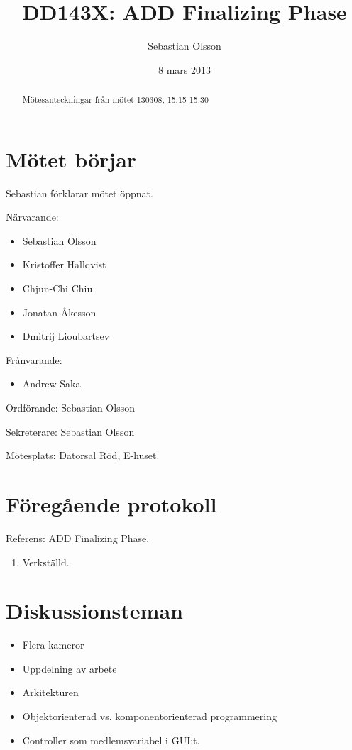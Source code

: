 \documentclass[a4paper,12pt]{article}
\author{Sebastian Olsson}
\title{DD143X: ADD Finalizing Phase}
\date{8 mars 2013}
\begin{document}
\maketitle
\begin{abstract}
    Mötesanteckningar från mötet 130308, 15:15-15:30
\end{abstract}

\section{Mötet börjar}
Sebastian förklarar mötet öppnat.

Närvarande:
\begin{itemize}
\item Sebastian Olsson
\item Kristoffer Hallqvist
\item Chjun-Chi Chiu
\item Jonatan Åkesson
\item Dmitrij Lioubartsev
\end{itemize}
Frånvarande:
\begin{itemize}
\item Andrew Saka
\end{itemize}

Ordförande: Sebastian Olsson

Sekreterare: Sebastian Olsson

Mötesplats: Datorsal Röd, E-huset.

\section{Föregående protokoll}
Referens: ADD Finalizing Phase.

\begin{enumerate}
\item Verkställd.
\end{enumerate}

\section{Diskussionsteman}
\begin{itemize}
\item Flera kameror
\item Uppdelning av arbete
\item Arkitekturen
\item Objektorienterad vs. komponentorienterad programmering
\item Controller som medlemsvariabel i GUI:t.
\end{itemize}
\end{document}
